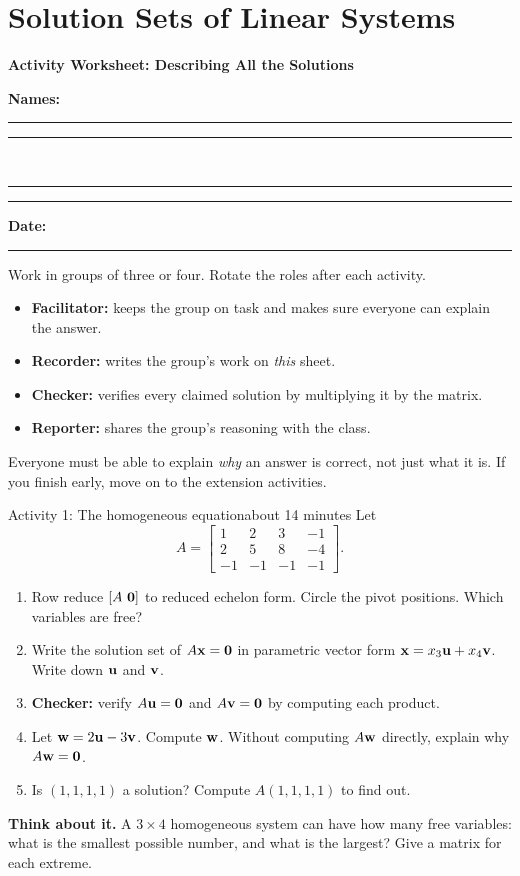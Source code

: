 \documentclass[11pt]{article}
\begin{document}
\section{Solution Sets of Linear Systems}

{\Large\bfseries Activity Worksheet: Describing All the Solutions}\par

\textbf{Names:} \rule{2.4in}{0.4pt}\quad\rule{2.4in}{0.4pt}\\[6pt]
\hspace*{3.8em}\rule{2.4in}{0.4pt}\quad\rule{1.3in}{0.4pt}\quad\textbf{Date:} \rule{0.9in}{0.4pt}

\begin{roles}
Work in groups of three or four. Rotate the roles after each activity.
\begin{itemize}[nosep]
  \item \textbf{Facilitator:} keeps the group on task and makes sure everyone can explain the answer.
  \item \textbf{Recorder:} writes the group's work on \emph{this} sheet.
  \item \textbf{Checker:} verifies every claimed solution by multiplying it by the matrix.
  \item \textbf{Reporter:} shares the group's reasoning with the class.
\end{itemize}
Everyone must be able to explain \emph{why} an answer is correct, not just what it is. If you finish
early, move on to the extension activities.
\end{roles}

\begin{activity}{Activity 1: The homogeneous equation}{about 14 minutes}
Let
\[
A=\begin{bmatrix}1&2&3&-1\\2&5&8&-4\\-1&-1&-1&-1\end{bmatrix}.
\]
\begin{enumerate}[label=(\alph*),itemsep=6pt]
  \item Row reduce $[A\ \mathbf{0}]$ to reduced echelon form. Circle the pivot positions. Which variables are free?
        \workspace{1.4in}
  \item Write the solution set of $A\mathbf{x}=\mathbf{0}$ in parametric vector form $\mathbf{x}=x_3\mathbf{u}+x_4\mathbf{v}$. Write down $\mathbf{u}$ and $\mathbf{v}$.
        \answerline
  \item \textbf{Checker:} verify $A\mathbf{u}=\mathbf{0}$ and $A\mathbf{v}=\mathbf{0}$ by computing each product.
        \answerline
  \item Let $\mathbf{w}=2\mathbf{u}-3\mathbf{v}$. Compute $\mathbf{w}$. Without computing $A\mathbf{w}$ directly, explain why $A\mathbf{w}=\mathbf{0}$.
        \answerline
  \item Is $(1,1,1,1)$ a solution? Compute $A(1,1,1,1)$ to find out.
        \answerline
\end{enumerate}
\textbf{Think about it.} A $3\times4$ homogeneous system can have how many free variables: what is the smallest possible number, and what is the largest? Give a matrix for each extreme.
\answerline\answerline
\end{activity}
\end{document}
